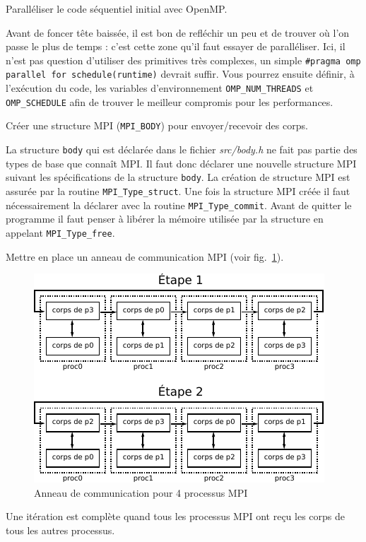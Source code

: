 \begin{questions}
	\question Paralléliser le code séquentiel initial avec OpenMP.
	\begin{solution}
		Avant de foncer tête baissée, il est bon de refléchir un peu et de trouver où l'on passe le plus de temps : c'est cette zone qu'il faut essayer de paralléliser.
		Ici, il n'est pas question d'utiliser des primitives très complexes, un simple \texttt{\#pragma omp parallel for schedule(runtime)} devrait suffir.
		Vous pourrez ensuite définir, à l'exécution du code, les variables d'environnement \texttt{OMP\_NUM\_THREADS} et \texttt{OMP\_SCHEDULE} afin de trouver le meilleur compromis pour les performances. 
	\end{solution}
	\question Créer une structure MPI (\texttt{MPI\_BODY}) pour envoyer/recevoir des corps.
	\begin{solution}
		La structure \texttt{body} qui est déclarée dans le fichier \textit{src/body.h} ne fait pas partie des types de base que connaît MPI.
		Il faut donc déclarer une nouvelle structure MPI suivant les spécifications de la structure \texttt{body}.
		La création de structure MPI est assurée par la routine \texttt{MPI\_Type\_struct}.
		Une fois la structure MPI créée il faut nécessairement la déclarer avec la routine \texttt{MPI\_Type\_commit}.
		Avant de quitter le programme il faut penser à libérer la mémoire utilisée par la structure en appelant \texttt{MPI\_Type\_free}.
	\end{solution}
	\question Mettre en place un anneau de communication MPI (voir fig.~\ref{fig:anneau}).
	\begin{figure}[htbp]
		\centering
		\includegraphics[width=0.6\linewidth]{schemas/anneau_sans_buffering.pdf}
		\caption{Anneau de communication pour 4 processus MPI}
		\label{fig:anneau}
	\end{figure}
	\begin{solution}
		Une itération est complète quand tous les processus MPI ont reçu les corps de tous les autres processus.

\end{solution}
\end{questions}
